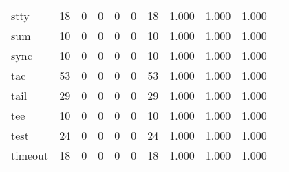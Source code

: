\begin{longtable}{lp{1.10cm}p{1.10cm}p{1.10cm}p{1.10cm}p{1.10cm}p{1.10cm}p{1.10cm}p{1.10cm}p{1.10cm}p{1.10cm}}
stty      &                     18 &                                  0 &                                 0 &                                0 &                                 0 &                              18 &                          1.000 &                                 1.000 &                               1.000 \\
sum       &                     10 &                                  0 &                                 0 &                                0 &                                 0 &                              10 &                          1.000 &                                 1.000 &                               1.000 \\
sync      &                     10 &                                  0 &                                 0 &                                0 &                                 0 &                              10 &                          1.000 &                                 1.000 &                               1.000 \\
tac       &                     53 &                                  0 &                                 0 &                                0 &                                 0 &                              53 &                          1.000 &                                 1.000 &                               1.000 \\
tail      &                     29 &                                  0 &                                 0 &                                0 &                                 0 &                              29 &                          1.000 &                                 1.000 &                               1.000 \\
tee       &                     10 &                                  0 &                                 0 &                                0 &                                 0 &                              10 &                          1.000 &                                 1.000 &                               1.000 \\
test      &                     24 &                                  0 &                                 0 &                                0 &                                 0 &                              24 &                          1.000 &                                 1.000 &                               1.000 \\
timeout   &                     18 &                                  0 &                                 0 &                                0 &                                 0 &                              18 &                          1.000 &                                 1.000 &                               1.000 \\

\end{longtable}
